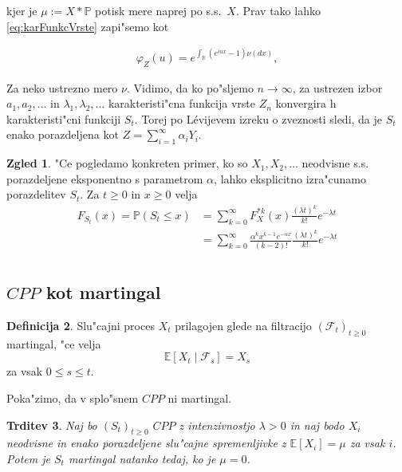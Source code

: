 \documentclass[12pt, a4paper, reqno]{amsart}
\theoremstyle{definition} %
\newtheorem{definicija}{Definicija}[section]
\newtheorem{zgled}[definicija]{Zgled}
\theoremstyle{plain} %
\newtheorem{trditev}[definicija]{Trditev}
\newcommand{\R}{\mathbb{R}}
\newcommand{\E}{\mathbb{E}}
\newcommand{\F}{\mathcal{F}}
\newcommand{\Prob}{\mathbb{P}}
\newcommand{\1}{\mathds{1}}
\begin{document}
    \noindent
    kjer je $\mu := X*\Prob$ potisk mere naprej po s.s.\ $X$. Prav tako lahko \ref{eq:karFunkcVrste} zapi"semo
    kot 

    \begin{align*}
        \varphi_{Z}(u) = e^{\int_{\R}\left(e^{i u x} - 1\right)\nu(dx)},
    \end{align*}

    \noindent
    Za neko ustrezno mero $\nu$. Vidimo, da ko po"sljemo $n\to \infty$, za ustrezen izbor 
    $a_1, a_2, \dots$ in $\lambda_1, \lambda_2, \dots$ karakteristi"cna funkcija 
    vrste $Z_n$ konvergira h karakteristi"cni funkciji $S_t$. Torej po Lévijevem izreku o zveznosti 
    sledi, da je $S_t$ enako porazdeljena kot $Z = \sum_{i=1}^{\infty}\alpha_iY_i$.

    \begin{zgled}
        "Ce pogledamo konkreten primer, ko so $X_1, X_2, \dots$ neodvisne s.s. porazdeljene eksponentno 
        s parametrom $\alpha$, lahko eksplicitno izra"cunamo porazdelitev $S_t$. Za $t\geq 0$
        in $x \geq 0$ velja
        \begin{align*}
            F_{S_t}(x) = \Prob(S_t \leq x)
            &= \sum_{k=0}^\infty F_X^{*k}(x)\frac{(\lambda t)^k}{k!}e^{-\lambda t}\\
            &= \sum_{k=0}^\infty \frac{\alpha^kx^{k-1}e^{-\alpha x}}{(k-2)!}\frac{(\lambda t)^k}{k!}e^{-\lambda t}\\
        \end{align*}
    \end{zgled}




    \subsection{$CPP$ kot martingal}

        \begin{definicija}
            Slu"cajni proces $X_t$ prilagojen glede na filtracijo $(\F_t)_{t\geq0}$
            martingal, "ce velja 
            $$
                \E\left[X_t\mid\F_s\right] = X_s
            $$
            za vsak $0\leq s \leq t$.
            \label{def:martingal}
        \end{definicija}

        Poka"zimo, da v splo"snem $CPP$ ni martingal.

        \begin{trditev}
            Naj bo $(S_t)_{t\geq0}$ $CPP$ z intenzivnostjo $\lambda>0$ in naj bodo $X_i$ neodvisne
            in enako porazdeljene slu"cajne spremenljivke z $\E\left[X_i\right] = \mu$ za vsak $i$.
            Potem je $S_t$ martingal natanko tedaj, ko je $\mu = 0$.
            \label{trd:CPPnimartingal}
        \end{trditev}
\end{document}
